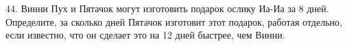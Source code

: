 44. Винни Пух и Пятачок могут изготовить подарок ослику Иа-Иа за 8 дней. Определите, за сколько дней Пятачок изготовит этот подарок, работая отдельно, если известно, что он сделает это на 12 дней быстрее, чем Винни.\\
